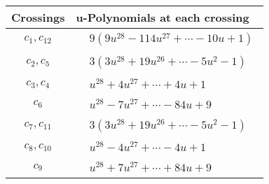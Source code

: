 \documentclass[1p]{elsarticle_modified}
\theoremstyle{definition}
\begin{document}
\begin{tabular}{m{50pt}|m{274pt}}
Crossings & \hspace{64pt}u-Polynomials at each crossing \\
\hline $$\begin{aligned}c_{1},c_{12}\end{aligned}$$&$\begin{aligned}
&9(9 u^{28}-114 u^{27}+\cdots-10 u+1)
\end{aligned}$\\
\hline $$\begin{aligned}c_{2},c_{5}\end{aligned}$$&$\begin{aligned}
&3(3 u^{28}+19 u^{26}+\cdots-5 u^2-1)
\end{aligned}$\\
\hline $$\begin{aligned}c_{3},c_{4}\end{aligned}$$&$\begin{aligned}
&u^{28}+4 u^{27}+\cdots+4 u+1
\end{aligned}$\\
\hline $$\begin{aligned}c_{6}\end{aligned}$$&$\begin{aligned}
&u^{28}-7 u^{27}+\cdots-84 u+9
\end{aligned}$\\
\hline $$\begin{aligned}c_{7},c_{11}\end{aligned}$$&$\begin{aligned}
&3(3 u^{28}+19 u^{26}+\cdots-5 u^2-1)
\end{aligned}$\\
\hline $$\begin{aligned}c_{8},c_{10}\end{aligned}$$&$\begin{aligned}
&u^{28}-4 u^{27}+\cdots-4 u+1
\end{aligned}$\\
\hline $$\begin{aligned}c_{9}\end{aligned}$$&$\begin{aligned}
&u^{28}+7 u^{27}+\cdots+84 u+9
\end{aligned}$\\
\hline
\end{tabular}\\~\\
\newpage\renewcommand{\arraystretch}{1}
\end{document}
